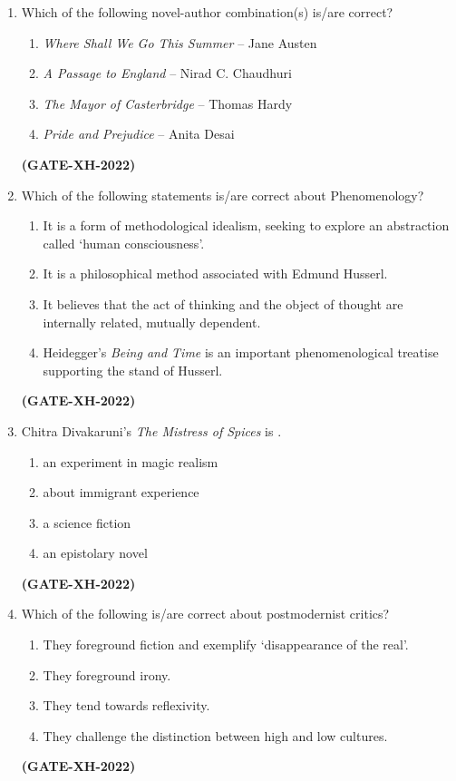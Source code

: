\documentclass[journal]{IEEEtran}
\begin{document}
\begin{enumerate}
\item Which of the following novel-author combination(s) is/are correct?
\begin{enumerate}
\item \textit{Where Shall We Go This Summer} – Jane Austen
\item \textit{A Passage to England} – Nirad C. Chaudhuri
\item \textit{The Mayor of Casterbridge} – Thomas Hardy
\item \textit{Pride and Prejudice} – Anita Desai
\end{enumerate}
\hfill\textbf{(GATE-XH-2022)}

\item Which of the following statements is/are correct about Phenomenology?
\begin{enumerate}
\item It is a form of methodological idealism, seeking to explore an abstraction called `human consciousness'.
\item It is a philosophical method associated with Edmund Husserl.
\item It believes that the act of thinking and the object of thought are internally related, mutually dependent.
\item Heidegger’s \textit{Being and Time} is an important phenomenological treatise supporting the stand of Husserl.
\end{enumerate}
\hfill\textbf{(GATE-XH-2022)}

\item Chitra Divakaruni’s \textit{The Mistress of Spices} is \underline{\hspace{3cm}}.
\begin{multicols}{2}
\begin{enumerate}
\item an experiment in magic realism
\item about immigrant experience
\item a science fiction
\item an epistolary novel
\end{enumerate}
\end{multicols}
\hfill\textbf{(GATE-XH-2022)}

\item Which of the following is/are correct about postmodernist critics?
\begin{enumerate}
\item They foreground fiction and exemplify `disappearance of the real'.
\item They foreground irony.
\item They tend towards reflexivity.
\item They challenge the distinction between high and low cultures.
\end{enumerate}
\hfill\textbf{(GATE-XH-2022)}


\end{enumerate}
\end{document}
